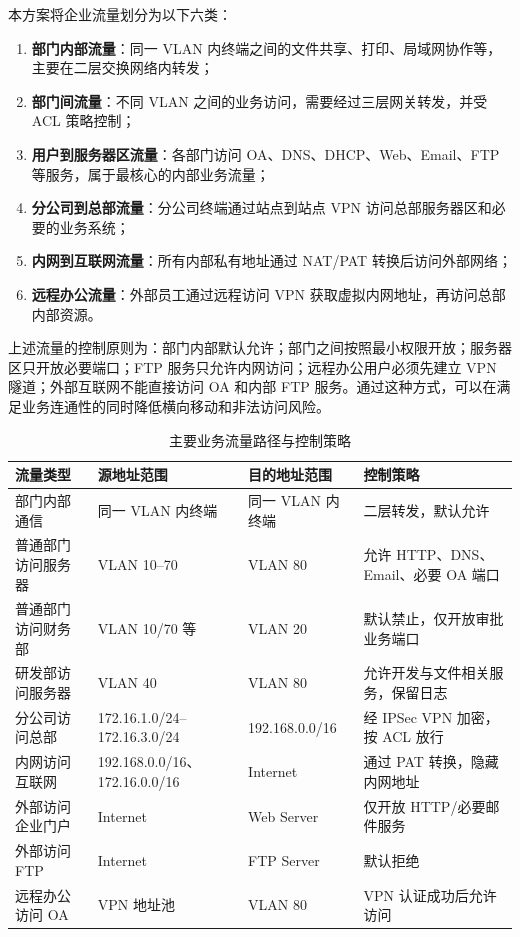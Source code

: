 \documentclass[12pt,a4paper]{ctexart}
\begin{document}
本方案将企业流量划分为以下六类：

\begin{enumerate}[label=(\arabic*), leftmargin=2em]
    \item \textbf{部门内部流量}：同一 VLAN 内终端之间的文件共享、打印、局域网协作等，主要在二层交换网络内转发；
    \item \textbf{部门间流量}：不同 VLAN 之间的业务访问，需要经过三层网关转发，并受 ACL 策略控制；
    \item \textbf{用户到服务器区流量}：各部门访问 OA、DNS、DHCP、Web、Email、FTP 等服务，属于最核心的内部业务流量；
    \item \textbf{分公司到总部流量}：分公司终端通过站点到站点 VPN 访问总部服务器区和必要的业务系统；
    \item \textbf{内网到互联网流量}：所有内部私有地址通过 NAT/PAT 转换后访问外部网络；
    \item \textbf{远程办公流量}：外部员工通过远程访问 VPN 获取虚拟内网地址，再访问总部内部资源。
\end{enumerate}

上述流量的控制原则为：部门内部默认允许；部门之间按照最小权限开放；服务器区只开放必要端口；FTP 服务只允许内网访问；远程办公用户必须先建立 VPN 隧道；外部互联网不能直接访问 OA 和内部 FTP 服务。通过这种方式，可以在满足业务连通性的同时降低横向移动和非法访问风险。

\begin{table}[H]
\centering
\caption{主要业务流量路径与控制策略}
\label{tab:traffic-policy}
\begin{tabular}{|p{3.2cm}|p{3.5cm}|p{3.5cm}|p{3.5cm}|}
\hline
\textbf{流量类型} & \textbf{源地址范围} & \textbf{目的地址范围} & \textbf{控制策略} \\ \hline
部门内部通信 & 同一 VLAN 内终端 & 同一 VLAN 内终端 & 二层转发，默认允许 \\ \hline
普通部门访问服务器 & VLAN 10--70 & VLAN 80 & 允许 HTTP、DNS、Email、必要 OA 端口 \\ \hline
普通部门访问财务部 & VLAN 10/70 等 & VLAN 20 & 默认禁止，仅开放审批业务端口 \\ \hline
研发部访问服务器 & VLAN 40 & VLAN 80 & 允许开发与文件相关服务，保留日志 \\ \hline
分公司访问总部 & 172.16.1.0/24--172.16.3.0/24 & 192.168.0.0/16 & 经 IPSec VPN 加密，按 ACL 放行 \\ \hline
内网访问互联网 & 192.168.0.0/16、172.16.0.0/16 & Internet & 通过 PAT 转换，隐藏内网地址 \\ \hline
外部访问企业门户 & Internet & Web Server & 仅开放 HTTP/必要邮件服务 \\ \hline
外部访问 FTP & Internet & FTP Server & 默认拒绝 \\ \hline
远程办公访问 OA & VPN 地址池 & VLAN 80 & VPN 认证成功后允许访问 \\ \hline
\end{tabular}
\end{table}
\end{document}
